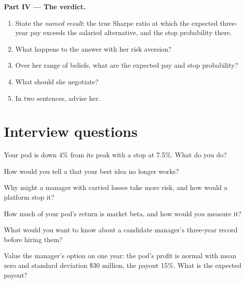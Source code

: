 \begin{problem}
\medskip\noindent\textbf{Part IV --- The verdict.}
\begin{enumerate}[resume]
\item State the \emph{named result}: the true Sharpe ratio at which the expected three-year pay exceeds the salaried
alternative, and the stop probability there.
\item What happens to the answer with her risk aversion?
\item Over her range of beliefs, what are the expected pay and stop probability?
\item What should she negotiate?
\item In two sentences, advise her.
\end{enumerate}
\end{problem}

\section{Interview questions}

\begin{interviewq}\label{iq:in:portfolio-manager-and-pod-analyst:1}
Your pod is down 4\% from its peak with a stop at 7.5\%. What do you do?
\end{interviewq}

\begin{interviewq}\label{iq:in:portfolio-manager-and-pod-analyst:2}
How would you tell a  that your best idea no longer works?
\end{interviewq}

\begin{interviewq}\label{iq:in:portfolio-manager-and-pod-analyst:3}
Why might a manager with carried losses take more risk, and how would a platform stop it?
\end{interviewq}

\begin{interviewq}\label{iq:in:portfolio-manager-and-pod-analyst:4}
How much of your pod's return is market beta, and how would you measure it?
\end{interviewq}

\begin{interviewq}\label{iq:in:portfolio-manager-and-pod-analyst:5}
What would you want to know about a candidate manager's three-year record before hiring them?
\end{interviewq}

\begin{interviewq}\label{iq:in:portfolio-manager-and-pod-analyst:6}
Value the manager's option on one year: the pod's profit is normal with mean zero and standard deviation \$30 million, the
payout 15\%. What is the expected payout?
\end{interviewq}
